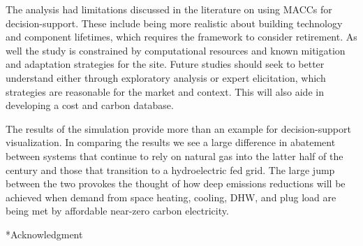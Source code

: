 \documentclass[twocolumn, a4paper,10pt]{article}
\makeatletter
\renewcommand\section{\@startsection{section}{1}{\z@}{3pt}{3pt}{\normalfont\large\bfseries}}
\makeatother
\begin{document}
The analysis had limitations discussed in the literature on using MACCs for decision-support. These include being more realistic about building technology and component lifetimes, which requires the framework to consider retirement. As well the study is constrained by computational resources and known mitigation and adaptation strategies for the site. Future studies should seek to better understand either through exploratory analysis or expert elicitation, which strategies are reasonable for the market and context. This will also aide in developing a cost and carbon database.

The results of the simulation provide more than an example for decision-support visualization. In comparing the results we see a large difference in abatement between systems that continue to rely on natural gas into the latter half of the century and those that transition to a hydroelectric fed grid. The large jump between the two provokes the thought of how deep emissions reductions will be achieved when demand from space heating, cooling, DHW, and plug load are being met by affordable near-zero carbon electricity.

\section*{Acknowledgment}


\footnotesize


\end{document}

